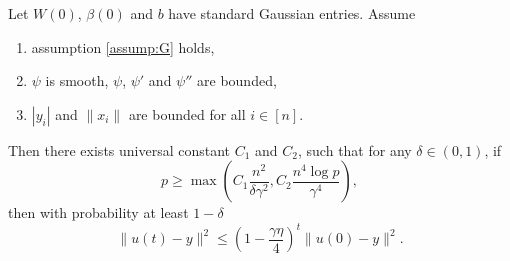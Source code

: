 \begin{theorem}\label{thm:nonliner_conv}
Let $W(0)$, $\beta(0)$ and $b$ have \iid standard Gaussian entries. Assume
\begin{enumerate}
    \item assumption \ref{assump:G} holds,
    \item $\psi$ is smooth, $\psi$, $\psi'$ and $\psi''$ are bounded,
    \item $|y_i|$ and $\|x_i\|$ are bounded for all $i\in[n]$.
\end{enumerate}
Then there exists universal constant $C_1$ and $C_2$, such that for any $\delta\in(0,1)$, if 
\begin{equation*}
    p \geq \max(C_1\frac{n^2}{\delta\gamma^2}, C_2\frac{n^4\log p}{\gamma^4}),
\end{equation*}
then with probability at least $1-\delta$
\begin{equation}\label{eq:conv}
    \|u(t)-y\|^2 \leq (1-\frac{\gamma\eta}{4})^t\|u(0)-y\|^2.
\end{equation}
\end{theorem}

